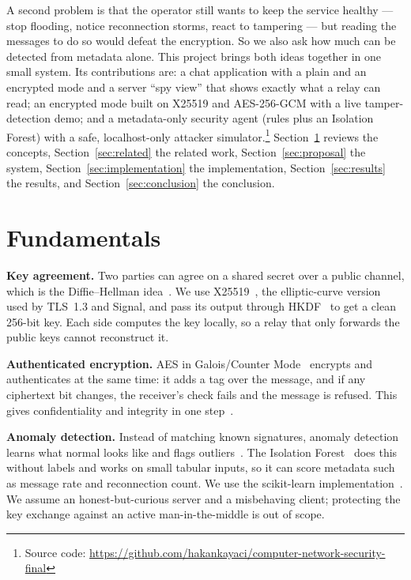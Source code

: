 \documentclass[onecolumn]{article}
\begin{document}
A second problem is that the operator still wants to keep the service healthy --- stop flooding, notice reconnection storms, react to tampering --- but reading the messages to do so would defeat the encryption. So we also ask how much can be detected from metadata alone. This project brings both ideas together in one small system. Its contributions are: a chat application with a plain and an encrypted mode and a server ``spy view'' that shows exactly what a relay can read; an encrypted mode built on X25519 and AES-256-GCM with a live tamper-detection demo; and a metadata-only security agent (rules plus an Isolation Forest) with a safe, localhost-only attacker simulator.\footnote{Source code: \url{https://github.com/hakankayaci/computer-network-security-final}} Section~\ref{sec:fundamentals} reviews the concepts, Section~\ref{sec:related} the related work, Section~\ref{sec:proposal} the system, Section~\ref{sec:implementation} the implementation, Section~\ref{sec:results} the results, and Section~\ref{sec:conclusion} the conclusion.

\section{Fundamentals}
\label{sec:fundamentals}

\textbf{Key agreement.} Two parties can agree on a shared secret over a public channel, which is the Diffie--Hellman idea~\cite{c1}. We use X25519~\cite{c2,c3}, the elliptic-curve version used by TLS~1.3 and Signal, and pass its output through HKDF~\cite{c4} to get a clean 256-bit key. Each side computes the key locally, so a relay that only forwards the public keys cannot reconstruct it.

\textbf{Authenticated encryption.} AES in Galois/Counter Mode~\cite{c5,c6} encrypts and authenticates at the same time: it adds a tag over the message, and if any ciphertext bit changes, the receiver's check fails and the message is refused. This gives confidentiality and integrity in one step~\cite{c7}.

\textbf{Anomaly detection.} Instead of matching known signatures, anomaly detection learns what normal looks like and flags outliers~\cite{c8}. The Isolation Forest~\cite{c9} does this without labels and works on small tabular inputs, so it can score metadata such as message rate and reconnection count. We use the scikit-learn implementation~\cite{c15}. We assume an honest-but-curious server and a misbehaving client; protecting the key exchange against an active man-in-the-middle is out of scope.
\end{document}
